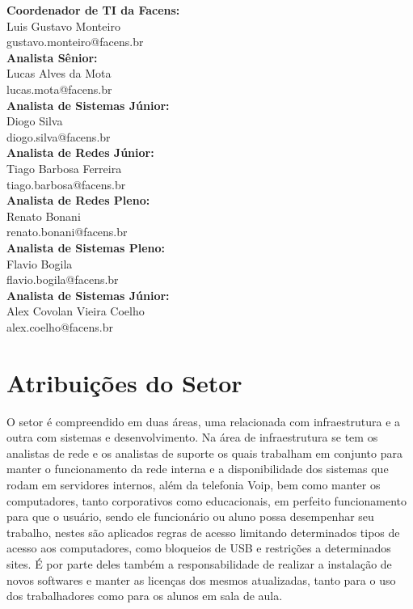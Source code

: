 \documentclass[
	12pt,				%
	oneside,			%
	a4paper,			%
	chapter=TITLE,		%
	section=TITLE,		%
	sumario=tradicional %
	english,			%
	french,				%
	spanish,			%
	brazil				%
	]{abntex2}
\begin{document}
\textbf{Coordenador de TI da Facens:} \\ \indent Luis Gustavo Monteiro \\
\indent gustavo.monteiro@facens.br \\

\textbf{Analista Sênior:} \\ \indent Lucas Alves da Mota \\
\indent lucas.mota@facens.br \\

\textbf{Analista de Sistemas Júnior:} \\ \indent  Diogo Silva \\
\indent diogo.silva@facens.br \\

\textbf{Analista de Redes Júnior:} \\ \indent  Tiago Barbosa Ferreira \\
\indent tiago.barbosa@facens.br \\

\textbf{Analista de Redes Pleno:} \\ \indent  Renato Bonani \\
\indent renato.bonani@facens.br \\

\textbf{Analista de Sistemas Pleno:} \\ \indent  Flavio Bogila \\
\indent flavio.bogila@facens.br \\

\textbf{Analista de Sistemas Júnior:} \\ \indent  Alex Covolan Vieira Coelho \\
\indent alex.coelho@facens.br \\

\section{Atribuições do Setor}
\label{sec:atribsetor}
O setor é compreendido em duas áreas, uma relacionada com infraestrutura e a outra com sistemas e desenvolvimento. Na área de infraestrutura se tem os analistas de rede e os analistas de suporte os quais trabalham em conjunto para manter o funcionamento da rede interna e a disponibilidade dos sistemas que rodam em servidores internos, além da telefonia Voip, bem como manter os computadores, tanto corporativos como educacionais, em perfeito funcionamento para que o usuário, sendo ele funcionário ou aluno possa desempenhar seu trabalho, nestes são aplicados regras de acesso limitando determinados tipos de acesso aos computadores, como bloqueios de USB e restrições a determinados sites. É por parte deles também a responsabilidade de realizar a instalação de novos softwares e manter as licenças dos mesmos atualizadas, tanto para o uso dos trabalhadores como para os alunos em sala de aula.
\end{document}
